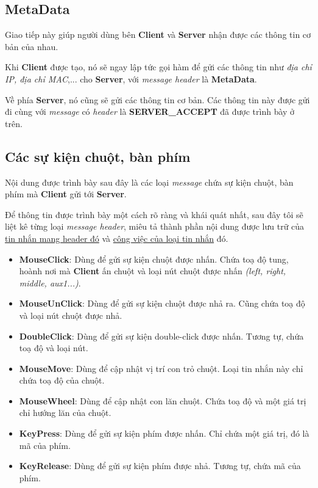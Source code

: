 \subsection{MetaData}

Giao tiếp này giúp người dùng bên \textbf{Client} và \textbf{Server} nhận được các thông tin cơ bản của nhau.

Khi \textbf{Client} được tạo, nó sẽ ngay lập tức gọi hàm để gửi các thông tin như \textit{địa chỉ IP, địa chỉ MAC},... cho \textbf{Server}, với \textit{message header} là \textbf{MetaData}.

Về phía \textbf{Server}, nó cũng sẽ gửi các thông tin cơ bản. Các thông tin này được gửi đi cùng với \textit{message} có  \textit{header} là \textbf{SERVER\_ACCEPT} đã được trình bày ở trên.

\subsection {Các sự kiện chuột, bàn phím}

Nội dung được trình bày sau đây là các loại \textit{message} chứa sự kiện chuột, bàn phím mà \textbf{Client} gửi tới \textbf{Server}.

Để thông tin được trình bày một cách rõ ràng và khái quát nhất, sau đây tôi sẽ liệt kê từng loại \textit{message header}, miêu tả thành phần nội dung được lưu trữ của \underline{tin nhắn mang header đó} và \underline{công việc của loại tin nhắn} đó.

\begin{itemize}
    \item \textbf{MouseClick}:  Dùng để gửi sự kiện chuột được nhấn. Chứa toạ độ tung, hoành nơi mà \textbf{Client} ấn chuột và loại nút chuột được nhấn \textit{(left, right, middle, aux1...)}.
    \item \textbf{MouseUnClick}: Dùng để gửi sự kiện chuột được nhả ra. Cũng chứa toạ độ và loại nút chuột được nhả.
    \item \textbf{DoubleClick}: Dùng để gửi sự kiện double-click được nhấn. Tương tự, chứa toạ độ và loại nút.
    \item \textbf{MouseMove}: Dùng để cập nhật vị trí con trỏ chuột. Loại tin nhắn này chỉ chứa toạ độ của chuột.
    \item \textbf{MouseWheel}: Dùng để cập nhật con lăn chuột. Chứa toạ độ và một giá trị chỉ hướng lăn của chuột.
    \item \textbf{KeyPress}: Dùng để gửi sự kiện phím được nhấn. Chỉ chứa một giá trị, đó là mã của phím.
    \item \textbf{KeyRelease}: Dùng để gửi sự kiện phím được nhả. Tương tự, chứa mã của phím.
\end{itemize}

